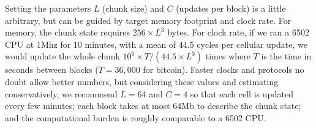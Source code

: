 \documentclass{article}
\newcommand\code[1]{{\tt #1}}
\newcommand\boldcode[1]{\code{#1}}
\newcommand\hex[1]{{\tt 0x#1}}
\begin{document}
Setting the parameters $L$ (chunk size) and $C$ (updates per block)
is a little arbitrary, but can be guided by target memory footprint and clock rate.
For memory, the chunk state requires $256 \times L^3$ bytes.
For clock rate, if we ran a 6502 CPU at 1Mhz for 10 minutes, with a mean of $44.5$ cycles per cellular update,
we would update the whole chunk $10^6 \times T / (44.5 \times L^3)$ times
where $T$ is the time in seconds between blocks ($T=36,000$ for bitcoin).
Faster clocks and protocols no doubt allow better numbers,
but considering these values and estimating conservatively,
we recommend $L=64$ and $C=4$ so that
each cell is updated every few minutes;
each block takes at most 64Mb to describe the chunk state;
and the computational burden is roughly comparable to a 6502 CPU.

\newcommand\memtable[1]{
\begin{tabular}{rlll}
  \hline
  Label & From & To & Contents \\
  \hline
  #1
  \hline
\end{tabular}
}

\newcommand\memrow[5]{
    \boldcode{#5} & \hex{{#1}00} & \hex{{#1}FF} & State of cell $(x#2,y#3,z#4)$ \\
}

\newcommand\memz[6]{
  \memrow{#1}{#4}{#5}{-1}{D#6}
  \memrow{#2}{#4}{#5}{}{#6}
  \memrow{#3}{#4}{#5}{+1}{U#6}
}

\newcommand\memyz[3]{
  \memz{{#1}0}{{#1}1}{{#1}2}{#2}{-1}{S#3}
  \memz{{#1}4}{{#1}5}{{#1}6}{#2}{}{#3}
  \memz{{#1}8}{{#1}9}{{#1}A}{#2}{+1}{N#3}
}

\newcommand\memxyz{
  \memyz{4}{-1}{W}

  \memz{50}{51}{52}{}{-1}{S}
  \memrow{54}{}{}{-1}{W}
  \memrow{56}{}{}{+1}{E}
  \memz{58}{59}{5A}{}{+1}{N}

  \memyz{6}{+1}{E}
}

\newcommand\vonneumannmap{\memtable{
  \memrow{45}{-1}{}{}{W}
  \memrow{51}{}{-1}{}{S}
  \memrow{54}{}{}{-1}{D}
  \memrow{56}{}{}{+1}{U}
  \memrow{59}{}{+1}{}{N}
  \memrow{65}{+1}{}{}{E}
}}

\newcommand\mooremap{\memtable{\memxyz}}
\end{document}
